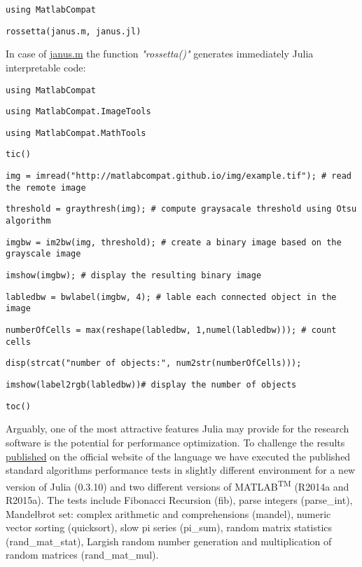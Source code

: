 \verb|using MatlabCompat|

\verb|rossetta(janus.m, janus.jl)|

In case of \href{https://github.com/MatlabCompat/MatlabCompat.jl/blob/dev/test/janus.m}{janus.m} the function \textit{"rossetta()"} generates immediately Julia interpretable code:

\verb|using MatlabCompat|

\verb|using MatlabCompat.ImageTools|

\verb|using MatlabCompat.MathTools|

\verb|tic()|

\verb|img = imread("http://matlabcompat.github.io/img/example.tif"); # read the remote image|

\verb|threshold = graythresh(img); # compute graysacale threshold using Otsu algorithm|

\verb|imgbw = im2bw(img, threshold); # create a binary image based on the grayscale image|

\verb|imshow(imgbw); # display the resulting binary image|

\verb|labledbw = bwlabel(imgbw, 4); # lable each connected object in the image|

\verb|numberOfCells = max(reshape(labledbw, 1,numel(labledbw))); # count cells|

\verb|disp(strcat("number of objects:", num2str(numberOfCells)));|

\verb|imshow(label2rgb(labledbw))# display the number of objects|

\verb|toc()|

Arguably, one of the most attractive features Julia may provide for the research software is the potential for performance optimization. To challenge the results \href{http://julialang.org/benchmarks/}{published} on the official website of the language we have executed the published standard algorithms performance tests in slightly different environment for a new version of Julia (0.3.10) and two different versions of MATLAB\textsuperscript{TM} (R2014a and R2015a). The tests include Fibonacci Recursion (fib), parse integers (parse\_int), Mandelbrot set: complex arithmetic and comprehensions (mandel), numeric vector sorting (quicksort), slow pi series (pi\_sum), random matrix statistics (rand\_mat\_stat), Largish random number generation and multiplication of random matrices (rand\_mat\_mul).

